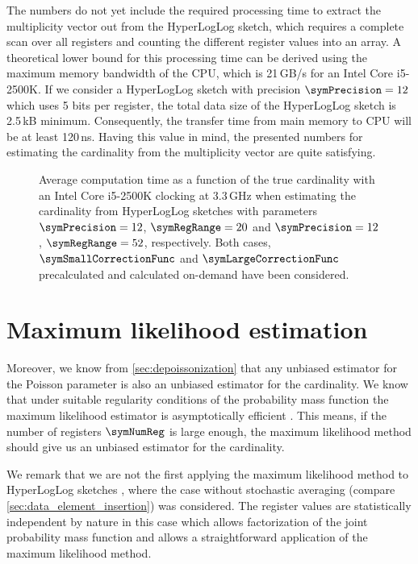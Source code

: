 \documentclass[a4paper]{scrartcl}
\begin{document}
The numbers do not yet include the required processing time to extract the multiplicity vector out from the HyperLogLog sketch, which requires a complete scan over all registers and counting the different register values into an array. A theoretical lower bound for this processing time can be derived using the maximum memory bandwidth of the CPU, which is 21\,GB/s for an Intel Core i5-2500K. If we consider a HyperLogLog sketch with precision $\symPrecision=12$ which uses 5 bits per register, the total data size of the HyperLogLog sketch is 2.5\,kB minimum. Consequently, the transfer time from main memory to CPU will be at least 120\,ns. Having this value in mind, the presented numbers for estimating the cardinality from the multiplicity vector are quite satisfying. 

\begin{figure}
\centering

\caption{Average computation time as a function of the true cardinality with an Intel Core i5-2500K clocking at 3.3\,GHz when estimating the cardinality from HyperLogLog sketches with parameters $\symPrecision=12$, $\symRegRange=20$ and $\symPrecision=12$, $\symRegRange=52$, respectively. Both cases, $\symSmallCorrectionFunc$ and $\symLargeCorrectionFunc$ precalculated and calculated on-demand have been considered.}
\label{fig:corrected_raw_avg_exec_time}
\end{figure}

\section{Maximum likelihood estimation}
Moreover, we know from \cref{sec:depoissonization} that any unbiased estimator for the Poisson parameter is also an unbiased estimator for the cardinality. We know that under suitable regularity conditions of the probability mass function the maximum likelihood estimator is asymptotically efficient \cite{Casella2002}. This means, if the number of registers $\symNumReg$ is large enough, the maximum likelihood method should give us an unbiased estimator for the cardinality.

We remark that we are not the first applying the maximum likelihood method to HyperLogLog sketches \cite{Clifford2012}, where the case without stochastic averaging (compare \cref{sec:data_element_insertion}) was considered. The register values are statistically independent by nature in this case which 
allows factorization of the joint probability mass function and allows a straightforward application of the maximum likelihood method. 
\end{document}
